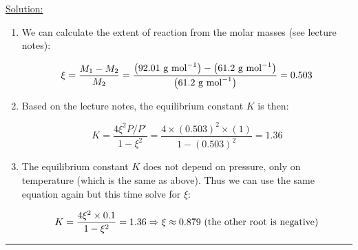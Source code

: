 \noindent
\underline{Solution:}

\begin{enumerate}
\item We can calculate the extent of reaction from the molar masses (see lecture notes):

$$\xi = \frac{M_1 - M_2}{M_2} = \frac{\left(92.01\textnormal{ g mol}^{-1}\right) - \left(61.2\textnormal{ g mol}^{-1}\right)}{\left(61.2\textnormal{ g mol}^{-1}\right)} = 0.503$$

\item Based on the lecture notes, the equilibrium constant $K$ is then:

$$K = \frac{4\xi^2 P/P^\circ}{1 - \xi^2} = \frac{4\times \left(0.503\right)^2\times (1)}{1 - \left(0.503\right)^2} = 1.36$$

\item The equilibrium constant $K$ does not depend on pressure, only on temperature (which is the same as above). Thus we can use the same equation again but this time solve for $\xi$:

$$K = \frac{4\xi^2\times 0.1}{1 - \xi^2} = 1.36 \Rightarrow \xi\approx 0.879\textnormal{ (the other root is negative)}$$
\end{enumerate}
\hrule\vspace{0.5cm}
